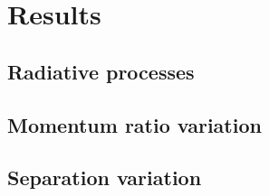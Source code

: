 \section{Results}

\subsection{Radiative processes}

\subsection{Momentum ratio variation}

\subsection{Separation variation}












